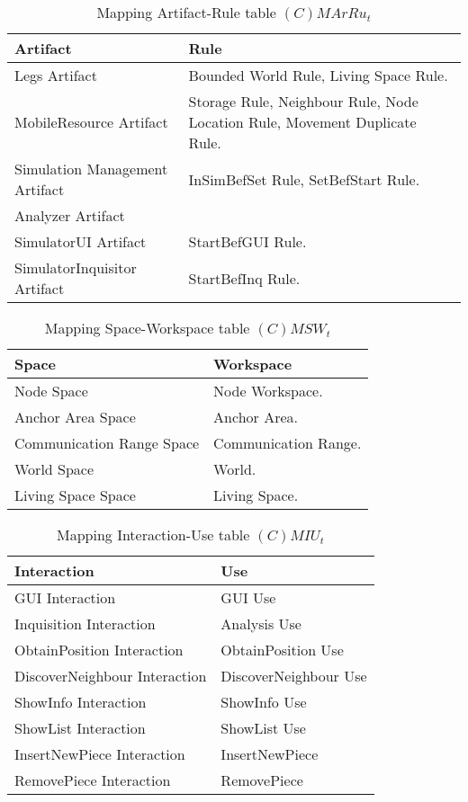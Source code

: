 \begin{table}[H]
	\centering
	\begin{tabular}{|p{4cm}|p{8cm}|}
			\hline
			\textbf{Artifact} & \textbf{Rule} \\
			\hline
			Legs Artifact & Bounded World Rule, Living Space Rule. \\
			\hline
			MobileResource Artifact & Storage Rule, Neighbour Rule, Node Location
			Rule, Movement Duplicate Rule. \\
			\hline
			Simulation Management Artifact & InSimBefSet Rule, SetBefStart Rule. \\
			\hline
			Analyzer Artifact & \\
			\hline
			SimulatorUI Artifact & StartBefGUI Rule. \\
			\hline
			SimulatorInquisitor Artifact & StartBefInq Rule. \\
			\hline
		\end{tabular}
	\caption{Mapping Artifact-Rule table $(C)MArRu_t$}
	\label{tab:cmarrut}
\end{table}

\begin{table}[H]
	\centering
	\begin{tabular}{|p{4cm}|p{8cm}|}
			\hline
			\textbf{Space} & \textbf{Workspace} \\
			\hline
			Node Space & Node Workspace. \\
			\hline
			Anchor Area Space & Anchor Area. \\
			\hline
			Communication Range Space & Communication Range.\\
			\hline
			World Space & World. \\
			\hline
			Living Space Space & Living Space. \\
			\hline
		\end{tabular}
	\caption{Mapping Space-Workspace table $(C)MSW_t$}
	\label{tab:cmsrt}
\end{table}

\begin{table}[H]
	\centering
	\begin{tabular}{|p{4cm}|p{8cm}|}
			\hline
			\textbf{Interaction} & \textbf{Use} \\
			\hline
			GUI Interaction & GUI Use \\
			\hline
			Inquisition Interaction & Analysis Use \\
			\hline
			ObtainPosition Interaction & ObtainPosition Use \\	
			\hline
			DiscoverNeighbour Interaction & DiscoverNeighbour Use \\	
			\hline
			ShowInfo Interaction & ShowInfo Use \\
			\hline
			ShowList Interaction & ShowList Use \\
			\hline
			InsertNewPiece Interaction & InsertNewPiece \\
			\hline
			RemovePiece Interaction & RemovePiece \\
			\hline
		\end{tabular}
	\caption{Mapping Interaction-Use table $(C)MIU_t$}
	\label{tab:cmiut}
\end{table}

